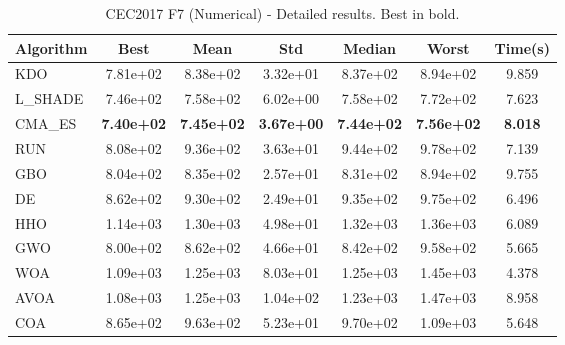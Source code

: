 \begin{table}[H]
\centering\small
\caption{CEC2017 F7 (Numerical) - Detailed results. Best in bold.}
\label{tab:cec2017_F7}
\begin{tabular}{lcccccc}
\toprule
\textbf{Algorithm} & \textbf{Best} & \textbf{Mean} & \textbf{Std} & \textbf{Median} & \textbf{Worst} & \textbf{Time(s)} \\
\midrule
KDO & 7.81e+02 & 8.38e+02 & 3.32e+01 & 8.37e+02 & 8.94e+02 & 9.859 \\
L_SHADE & 7.46e+02 & 7.58e+02 & 6.02e+00 & 7.58e+02 & 7.72e+02 & 7.623 \\
CMA_ES & \textbf{7.40e+02} & \textbf{7.45e+02} & \textbf{3.67e+00} & \textbf{7.44e+02} & \textbf{7.56e+02} & \textbf{8.018} \\
RUN & 8.08e+02 & 9.36e+02 & 3.63e+01 & 9.44e+02 & 9.78e+02 & 7.139 \\
GBO & 8.04e+02 & 8.35e+02 & 2.57e+01 & 8.31e+02 & 8.94e+02 & 9.755 \\
DE & 8.62e+02 & 9.30e+02 & 2.49e+01 & 9.35e+02 & 9.75e+02 & 6.496 \\
HHO & 1.14e+03 & 1.30e+03 & 4.98e+01 & 1.32e+03 & 1.36e+03 & 6.089 \\
GWO & 8.00e+02 & 8.62e+02 & 4.66e+01 & 8.42e+02 & 9.58e+02 & 5.665 \\
WOA & 1.09e+03 & 1.25e+03 & 8.03e+01 & 1.25e+03 & 1.45e+03 & 4.378 \\
AVOA & 1.08e+03 & 1.25e+03 & 1.04e+02 & 1.23e+03 & 1.47e+03 & 8.958 \\
COA & 8.65e+02 & 9.63e+02 & 5.23e+01 & 9.70e+02 & 1.09e+03 & 5.648 \\
\bottomrule
\end{tabular}
\end{table}
